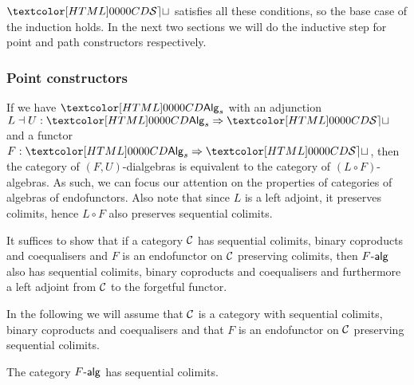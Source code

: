 $\SET$ satisfies all these conditions, so the base case of the
induction holds. In the next two sections we will do the inductive
step for point and path constructors respectively.

\subsubsection{Point constructors}

If we have $\Alg_s$ with an adjunction
$L \dashv U : \Func{\Alg_s}{\SET}$ and a functor
$F : \Func{\Alg_s}{\SET}$, then the category of $(F,U)$-dialgebras is
equivalent to the category of $(L \circ F)$-algebras. As such, we can
focus our attention on the properties of categories of algebras of
endofunctors. Also note that since $L$ is a left adjoint, it preserves
colimits, hence $L \circ F$ also preserves sequential colimits.

It suffices to show that if a category $\mathcal{C}$ has sequential colimits,
binary coproducts and coequalisers and $F$ is an endofunctor on $\mathcal{C}$
preserving colimits, then $\algcat{F}$ also has sequential colimits,
binary coproducts and coequalisers and furthermore a left adjoint from
$\mathcal{C}$ to the forgetful functor.

In the following we will assume that $\mathcal{C}$ is a category with
sequential colimits, binary coproducts and coequalisers and that $F$
is an endofunctor on $\mathcal{C}$ preserving sequential colimits.

\begin{proposition}
  The category $\algcat{F}$ has sequential colimits.
\end{proposition}

